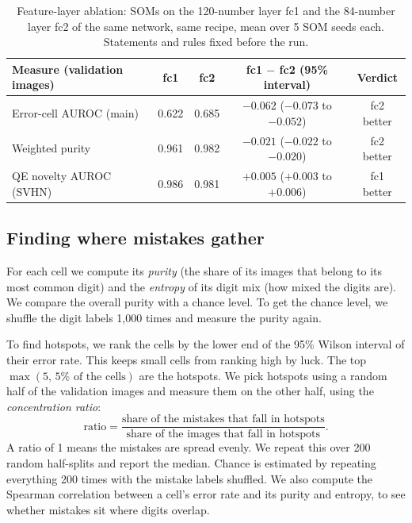 \documentclass[11pt]{article}
\begin{document}
\begin{table}[H]
\centering
\renewcommand{\arraystretch}{1.12}
\small
\begin{tabular}{|l|c|c|c|c|}
\hline
\textbf{Measure (validation images)} & \textbf{fc1} & \textbf{fc2} & \textbf{fc1 $-$ fc2 (95\% interval)} & \textbf{Verdict} \\ \hline
Error-cell AUROC (main) & 0.622 & 0.685 & $-0.062$ ($-0.073$ to $-0.052$) & fc2 better \\ \hline
Weighted purity & 0.961 & 0.982 & $-0.021$ ($-0.022$ to $-0.020$) & fc2 better \\ \hline
QE novelty AUROC (SVHN) & 0.986 & 0.981 & $+0.005$ ($+0.003$ to $+0.006$) & fc1 better \\ \hline
\end{tabular}
\caption{Feature-layer ablation: SOMs on the 120-number layer fc1 and the 84-number layer fc2 of the same network, same recipe, mean over 5 SOM seeds each. Statements and rules fixed before the run.}
\label{tab:layer_ablation}
\end{table}

\subsection{Finding where mistakes gather}

For each cell we compute its \emph{purity} (the share of its images that belong to its most common digit) and the \emph{entropy} of its digit mix (how mixed the digits are). We compare the overall purity with a chance level. To get the chance level,
we shuffle the digit labels 1,000 times and measure the purity again.

To find hotspots, we rank the cells by the lower end of the 95\% Wilson interval \parencite{wilson1927probable} of their error rate. This keeps small cells from ranking high by luck.
The top $\max(5,\,5\%\text{ of the cells})$ are the hotspots. We pick hotspots using a random half of the validation images and measure them on the other half, using the \emph{concentration ratio}:
\[
\text{ratio}=\frac{\text{share of the mistakes that fall in hotspots}}{\text{share of the images that fall in hotspots}}.
\]
A ratio of 1 means the mistakes are spread evenly. We repeat this over 200 random half-splits and report the median. Chance is estimated by repeating everything 200 times with the mistake labels shuffled.
We also compute the Spearman correlation between a cell's error rate and its purity and entropy, to see whether mistakes sit where digits overlap.
\end{document}
